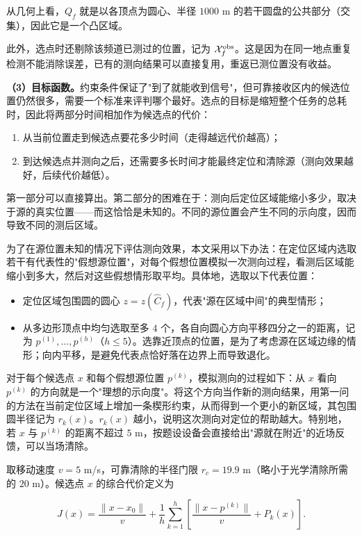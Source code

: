 从几何上看，$Q_f$ 就是以各顶点为圆心、半径 $1000$ m 的若干圆盘的公共部分（交集），因此它是一个凸区域。

此外，选点时还剔除该频道已测过的位置，记为 $\mathcal X_f^{\rm obs}$。这是因为在同一地点重复检测不能消除误差，已有的测向结果可以直接复用，重返已测位置没有收益。

\textbf{（3）目标函数。}约束条件保证了"到了就能收到信号"，但可靠接收区内的候选位置仍然很多，需要一个标准来评判哪个最好。选点的目标是缩短整个任务的总耗时，因此将两部分时间相加作为候选点的代价：

\begin{enumerate}
\item 从当前位置走到候选点要花多少时间（走得越远代价越高）；
\item 到达候选点并测向之后，还需要多长时间才能最终定位和清除源（测向效果越好，后续代价越低）。
\end{enumerate}

第一部分可以直接算出。第二部分的困难在于：测向后定位区域能缩小多少，取决于源的真实位置——而这恰恰是未知的。不同的源位置会产生不同的示向度，因而导致不同的测后区域。

为了在源位置未知的情况下评估测向效果，本文采用以下办法：在定位区域内选取若干有代表性的"假想源位置"，对每个假想位置模拟一次测向过程，看测后区域能缩小到多大，然后对这些假想情形取平均。具体地，选取以下代表位置：

\begin{itemize}
\item 定位区域包围圆的圆心 $z=z(\widehat C_f)$，代表"源在区域中间"的典型情形；
\item 从多边形顶点中均匀选取至多 $4$ 个，各自向圆心方向平移四分之一的距离，记为 $p^{(1)},\dots,p^{(h)}$（$h\le5$）。选靠近顶点的位置，是为了考虑源在区域边缘的情形；向内平移，是避免代表点恰好落在边界上而导致退化。
\end{itemize}

对于每个候选点 $x$ 和每个假想源位置 $p^{(k)}$，模拟测向的过程如下：从 $x$ 看向 $p^{(k)}$ 的方向就是一个"理想的示向度"。将这个方向当作新的测向结果，用第一问的方法在当前定位区域上增加一条楔形约束，从而得到一个更小的新区域，其包围圆半径记为 $r_k(x)$。$r_k(x)$ 越小，说明这次测向对定位的帮助越大。特别地，若 $x$ 与 $p^{(k)}$ 的距离不超过 $5$ m，按题设设备会直接给出"源就在附近"的近场反馈，可以当场清除。

取移动速度 $v=5$ m/s，可靠清除的半径门限 $r_c=19.9$ m（略小于光学清除所需的 $20$ m）。候选点 $x$ 的综合代价定义为

\begin{equation}\label{eq:q2-5}
J(x)=\frac{\|x-x_0\|}{v}
+\frac1h\sum_{k=1}^{h}\left[\frac{\|x-p^{(k)}\|}{v}+P_k(x)\right].
\end{equation}

